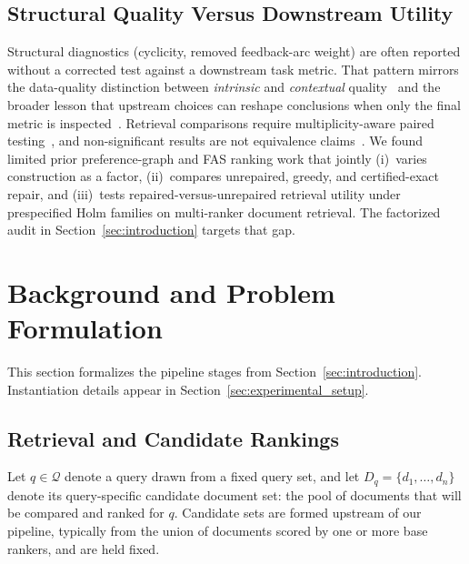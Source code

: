 \documentclass[pdflatex,sn-basic,Numbered]{sn-jnl}
\begin{document}
\subsection{Structural Quality Versus Downstream Utility}
\label{sec:related-utility}

Structural diagnostics (cyclicity, removed feedback-arc weight) are often
reported without a corrected test against a downstream task metric. That
pattern mirrors the data-quality distinction between \emph{intrinsic} and
\emph{contextual} quality~\cite{wang1996beyond} and the broader lesson that
upstream choices can reshape conclusions when only the final metric is
inspected~\cite{sambasivan2021datacascades,northcutt2021labelerrors}.
Retrieval comparisons require multiplicity-aware paired
testing~\cite{urbano2019statistical,carterette2012multiple,ihemelandu2024multiple},
and non-significant results are not equivalence
claims~\cite{lakens2018equivalence}. We found limited prior preference-graph
and FAS ranking work that jointly (i)~varies construction as a factor,
(ii)~compares unrepaired, greedy, and certified-exact repair, and
(iii)~tests repaired-versus-unrepaired retrieval utility under
prespecified Holm families on multi-ranker document retrieval. The
factorized audit in Section~\ref{sec:introduction} targets that gap.

\section{Background and Problem Formulation}
\label{sec:background}

This section formalizes the pipeline stages from
Section~\ref{sec:introduction}. Instantiation details appear in
Section~\ref{sec:experimental_setup}.

\subsection{Retrieval and Candidate Rankings}
\label{sec:retrieval-setting}

Let $q \in \mathcal{Q}$ denote a query drawn from a fixed query set, and let
$D_q = \{d_1,\dots,d_n\}$ denote its query-specific candidate document set:
the pool of documents that will be compared and ranked for $q$. Candidate
sets are formed upstream of our pipeline, typically from the union
of documents scored by one or more base rankers, and are held fixed.
\end{document}
